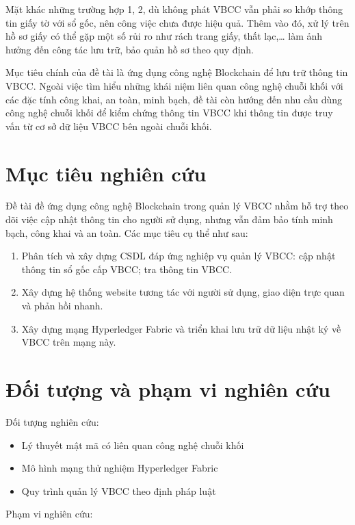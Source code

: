 Mặt khác những trường hợp 1, 2, dù không phát VBCC vẫn phải so khớp thông tin giấy tờ với sổ gốc, nên công việc chưa được hiệu quả. Thêm vào đó, xử lý trên hồ sơ giấy có thể gặp một số rủi ro như rách trang giấy, thất lạc,\ldots{} làm ảnh hưởng đến công tác lưu trữ, bảo quản hồ sơ theo quy định.

Mục tiêu chính của đề tài là ứng dụng công nghệ Blockchain để lưu trữ thông tin VBCC. Ngoài việc tìm hiểu những khái niệm liên quan công nghệ chuỗi khối với các đặc tính công khai, an toàn, minh bạch, đề tài còn hướng đến nhu cầu dùng công nghệ chuỗi khối để kiểm chứng thông tin VBCC khi thông tin được truy vấn từ cơ sở dữ liệu VBCC bên ngoài chuỗi khối.

\section{Mục tiêu nghiên cứu}

Đề tài đề ứng dụng công nghệ Blockchain trong quản lý VBCC nhằm hỗ trợ theo dõi việc cập nhật thông tin cho người sử dụng, nhưng vẫn đảm bảo tính minh bạch, công khai và an toàn. Các mục tiêu cụ thể như sau:

\begin{enumerate}
\item Phân tích và xây dựng CSDL đáp ứng nghiệp vụ quản lý VBCC: cập nhật thông tin sổ gốc cấp VBCC; tra thông tin VBCC.
\item Xây dựng hệ thống website tương tác với người sử dụng, giao diện trực quan và phản hồi nhanh.
\item Xây dựng mạng Hyperledger Fabric và triển khai lưu trữ dữ liệu nhật ký về VBCC trên mạng này.
\end{enumerate}

\section{Đối tượng và phạm vi nghiên cứu}

Đối tượng nghiên cứu:

\begin{itemize}
\item Lý thuyết mật mã có liên quan công nghệ chuỗi khối
\item Mô hình mạng thử nghiệm Hyperledger Fabric
\item Quy trình quản lý VBCC theo định pháp luật
\end{itemize}

Phạm vi nghiên cứu:

